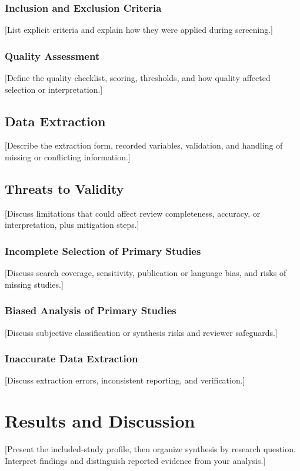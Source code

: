 \documentclass[11pt]{article}
\begin{document}
\subsubsection{Inclusion and Exclusion Criteria}
[List explicit criteria and explain how they were applied during screening.]

\subsubsection{Quality Assessment}
[Define the quality checklist, scoring, thresholds, and how quality affected selection or interpretation.]

\subsection{Data Extraction}
[Describe the extraction form, recorded variables, validation, and handling of missing or conflicting information.]

\subsection{Threats to Validity}
[Discuss limitations that could affect review completeness, accuracy, or interpretation, plus mitigation steps.]

\subsubsection{Incomplete Selection of Primary Studies}
[Discuss search coverage, sensitivity, publication or language bias, and risks of missing studies.]

\subsubsection{Biased Analysis of Primary Studies}
[Discuss subjective classification or synthesis risks and reviewer safeguards.]

\subsubsection{Inaccurate Data Extraction}
[Discuss extraction errors, inconsistent reporting, and verification.]

\section{Results and Discussion}
[Present the included-study profile, then organize synthesis by research question. Interpret findings and distinguish reported evidence from your analysis.]
\end{document}
